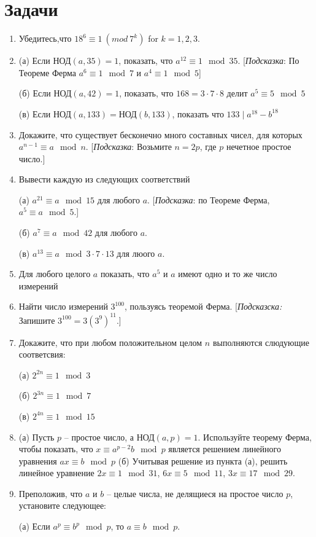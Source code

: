 \documentclass[4apaper,11pt]{article}
\begin{document}
\section{Задачи}
\begin{enumerate}
\item Убедитесь,что $18^6\equiv1~(mod~7^k)$ for $k=1,2,3$.
\item 
(а) Если $\text{НОД}(a,35)=1$, показать, что $a^{12}\equiv1\mod 35$. [\textsl{Подсказка}: По Теореме Ферма $a^6\equiv1\mod7$ и $a^4\equiv1\mod5$]

(б) Если $\text{НОД}(a,42)=1$, показать, что $168=3\cdot7\cdot8$ делит $a^5\equiv 5\mod5$  

(в) Если $\text{НОД}(a,133)=\text{НОД}(b,133)$, показать что $133\mid a^{18}-b^{18}$
\item Докажите, что существует бесконечно много составных чисел, для которых $a^{n-1}\equiv a\mod n$. [\textsl{Подсказка}: Возьмите $n=2p$, где $p$ нечетное простое число.]
\item Вывести каждую из следующих соответствий 

(а) $a^{21}\equiv a\mod 15$ для любого $a$. [\textsl{Подсказка}: по Теореме Ферма, $a^5\equiv a \mod5$.]

(б) $a^7\equiv a\mod42$ для любого $a$.

(в) $a^{13}\equiv a\mod 3\cdot7\cdot13$ для люого $a$.
\item Для любого целого $a$ показать, что $a^5$ и $a$ имеют одно и то же число измерений
\item Найти число измерений $3^{100}$, пользуясь теоремой Ферма. [\textsl{Подсказска:} Запишите $3^{100}=3(3^9)^{11}$.]
\item Докажите, что при любом положительном целом $n$ выполняются слюдующие соответсвия:

(а) $2^{2n}\equiv 1\mod 3$

(б) $2^{3n}\equiv 1\mod 7$

(в) $2^{4n}\equiv 1\mod 15$
\item 
(а) Пусть $p$ -- простое число, а $\text{НОД}(a,p)=1$. Используйте теорему Ферма, чтобы показать, что $x\equiv a^{p-2}b\mod p$ является решением линейного уравнения $ax\equiv b\mod p$
(б) Учитывая решение из пункта (а), решить линейное уравнение $2x\equiv 1\mod 31$, $6x\equiv 5\mod 11$, $3x\equiv 17\mod 29$.
\item Преположив, что $a$ и $b$ -- целые числа, не делящиеся на простое число $p$, установите следующее:

(а) Если $a^p\equiv b^p\mod p$, то $a\equiv b\mod p$.


\end{enumerate}
\end{document}
